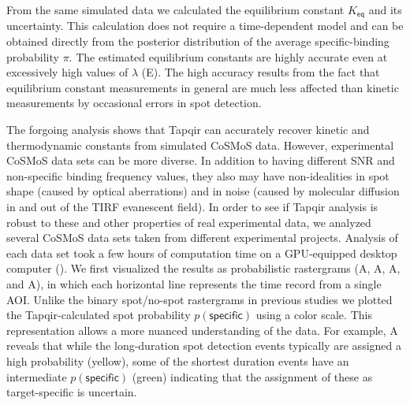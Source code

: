 



From the same simulated data we calculated the equilibrium constant $K_\mathsf{eq}$ and its uncertainty. This calculation does not require a time-dependent model and can be obtained directly from the posterior distribution of the average specific-binding probability $\pi$. The estimated equilibrium constants are highly accurate even at excessively high values of $\lambda$ (E).  The high accuracy results from the fact that equilibrium constant measurements in general are much less affected than kinetic measurements by occasional errors in spot detection. 

The forgoing analysis shows that Tapqir can accurately recover kinetic and thermodynamic constants from simulated CoSMoS data.  However, experimental CoSMoS data sets can be more diverse.  In addition to having different SNR and non-specific binding frequency values, they also may have non-idealities in spot shape (caused by optical aberrations) and in noise (caused by molecular diffusion in and out of the TIRF evanescent field).  In order to see if Tapqir analysis is robust to these and other properties of real experimental data, we analyzed several CoSMoS data sets taken from different experimental projects. Analysis of each data set took a few hours of computation time on a GPU-equipped desktop computer (). We first visualized the results as probabilistic rastergrams (A, A, A, and A), in which each horizontal line represents the time record from a single AOI.  Unlike the binary spot/no-spot rastergrams in previous studies \citep{Friedman2013-sf,Rosen2020-zn} we plotted the Tapqir-calculated spot probability $p(\mathsf{specific})$ using a color scale.  This representation allows a more nuanced understanding of the data.  For example, A reveals that while the long-duration spot detection events typically are assigned a high probability (yellow), some of the shortest duration events have an intermediate $p(\mathsf{specific})$ (green) indicating that the assignment of these as target-specific is uncertain.  

